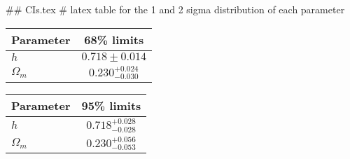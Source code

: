 ## CIs.tex
# latex table for the 1 and 2 sigma distribution of each parameter

\begin{tabular} { l  c}
 Parameter &  68\% limits\\
\hline
{\boldmath$h              $} & $0.718\pm 0.014            $\\
{\boldmath$\Omega_m       $} & $0.230^{+0.024}_{-0.030}   $\\
\hline
\end{tabular}

\begin{tabular} { l  c}
 Parameter &  95\% limits\\
\hline
{\boldmath$h              $} & $0.718^{+0.028}_{-0.028}   $\\
{\boldmath$\Omega_m       $} & $0.230^{+0.056}_{-0.053}   $\\
\hline
\end{tabular}
